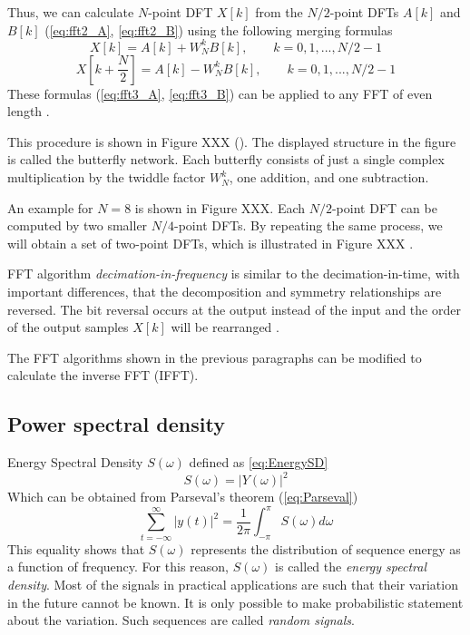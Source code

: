 \documentclass[twoside]{ctuthesis}
\theoremstyle{plain}
\theoremstyle{definition}
\theoremstyle{note}
\begin{document}
Thus, we can calculate $N$-point DFT $X[k]$ from the $N/2$-point DFTs $A[k]$ and $B[k]$ (\ref{eq:fft2_A}, \ref{eq:fft2_B}) using the following merging formulas
\begin{equation} \label{eq:fft3_A}
	X[k]=A[k] + W^{k}_{N}B[k],\qquad k=0, 1, ..., N/2 -1
\end{equation}
\begin{equation} \label{eq:fft3_B}
	X[k+\frac{N}{2}]=A[k] - W^{k}_{N}B[k],\qquad k=0, 1, ..., N/2 -1
\end{equation}
These formulas (\ref{eq:fft3_A}, \ref{eq:fft3_B}) can be applied to any FFT of even length \cite{cite:3}.

This procedure is shown in Figure XXX (\cite{cite:3}). The displayed structure in the figure is called the butterfly network. Each butterfly consists of just a single complex multiplication by the twiddle factor $W^{k}_{N}$, one addition, and one subtraction. 

An example for $N=8$ is shown in Figure XXX. Each $N/2$-point DFT can be computed by two smaller $N/4$-point DFTs. By repeating the same process, we will obtain a set of two-point DFTs, which is illustrated in Figure XXX \cite{cite:RT_DSP}.

FFT algorithm \textit{decimation-in-frequency} is similar to the decimation-in-time, with important differences, that the decomposition and symmetry relationships are reversed. The bit reversal occurs at the output instead of the input and the order of the output samples $X[k]$ will be rearranged \cite{cite:RT_DSP}.

The FFT algorithms shown in the previous paragraphs can be modified to calculate the inverse FFT (IFFT).

\subsection{Power spectral density}
\label{sec:PSD}
Energy Spectral Density $S(\omega)$ defined as \ref{eq:EnergySD}
\begin{equation} \label{eq:EnergySD}
	S(\omega)=\left|Y(\omega)\right|^2
\end{equation}
Which can be obtained from Parseval's theorem (\ref{eq:Parseval})
\begin{equation} \label{eq:Parseval}
	\sum_{t=-\infty}^{\infty}\left|y(t)\right|^2 = \frac{1}{2\pi}\int_{-\pi}^{\pi}S(\omega)d\omega
\end{equation}
This equality shows that $S(\omega)$ represents the distribution of sequence energy as a function of frequency. For this reason, $S(\omega)$ is called the \textit{energy spectral density}. 
Most of the signals in practical applications are such that their variation in the future cannot be known. It is only possible to make probabilistic statement about the variation. Such sequences are called \textit{random signals}. 
\end{document}
